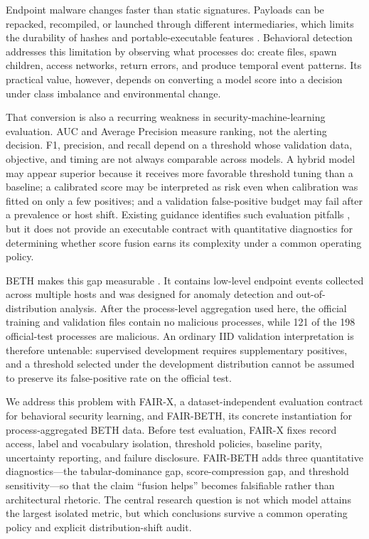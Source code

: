 \documentclass[10pt,journal,compsoc]{IEEEtran}
\begin{document}
Endpoint malware changes faster than static signatures. Payloads can be repacked, recompiled, or launched through different intermediaries, which limits the durability of hashes and portable-executable features \cite{sikorski2012,anderson2018}. Behavioral detection addresses this limitation by observing what processes do: create files, spawn children, access networks, return errors, and produce temporal event patterns. Its practical value, however, depends on converting a model score into a decision under class imbalance and environmental change.

That conversion is also a recurring weakness in security-machine-learning evaluation. AUC and Average Precision measure ranking, not the alerting decision. F1, precision, and recall depend on a threshold whose validation data, objective, and timing are not always comparable across models. A hybrid model may appear superior because it receives more favorable threshold tuning than a baseline; a calibrated score may be interpreted as risk even when calibration was fitted on only a few positives; and a validation false-positive budget may fail after a prevalence or host shift. Existing guidance identifies such evaluation pitfalls \cite{arp2022}, but it does not provide an executable contract with quantitative diagnostics for determining whether score fusion earns its complexity under a common operating policy.

BETH makes this gap measurable \cite{highnam2021}. It contains low-level endpoint events collected across multiple hosts and was designed for anomaly detection and out-of-distribution analysis. After the process-level aggregation used here, the official training and validation files contain no malicious processes, while 121 of the 198 official-test processes are malicious. An ordinary IID validation interpretation is therefore untenable: supervised development requires supplementary positives, and a threshold selected under the development distribution cannot be assumed to preserve its false-positive rate on the official test.

We address this problem with FAIR-X, a dataset-independent evaluation contract for behavioral security learning, and FAIR-BETH, its concrete instantiation for process-aggregated BETH data. Before test evaluation, FAIR-X fixes record access, label and vocabulary isolation, threshold policies, baseline parity, uncertainty reporting, and failure disclosure. FAIR-BETH adds three quantitative diagnostics---the tabular-dominance gap, score-compression gap, and threshold sensitivity---so that the claim ``fusion helps'' becomes falsifiable rather than architectural rhetoric. The central research question is not which model attains the largest isolated metric, but which conclusions survive a common operating policy and explicit distribution-shift audit.
\end{document}

